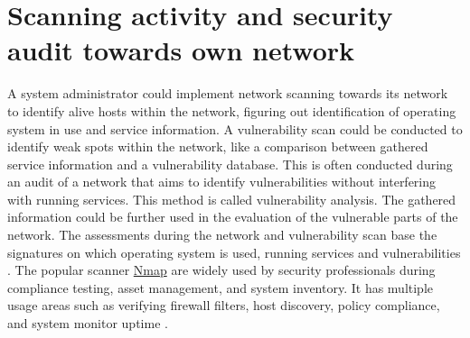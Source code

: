 \section{Scanning activity and security audit towards own network}
\label{s:ScanOwnNetwork}
A system administrator could implement network scanning towards its network to identify alive hosts within the network, figuring out identification of operating system in use and service information. A vulnerability scan could be conducted to identify weak spots within the network, like a comparison between gathered service information and a vulnerability database. This is often conducted during an audit of a network that aims to identify vulnerabilities without interfering with running services. This method is called vulnerability analysis. The gathered information could be further used in the evaluation of the vulnerable parts of the network. The assessments during the network and vulnerability scan base the signatures on which operating system is used, running services and vulnerabilities \autocite{holm2011quantitative}.
The popular scanner \hyperref[s:HowNmapWorks]{Nmap} are widely used by security professionals during compliance testing, asset management, and system inventory. It has multiple usage areas such as verifying firewall filters, host discovery, policy compliance, and system monitor uptime \autocite{pinkard2008nmap}.
